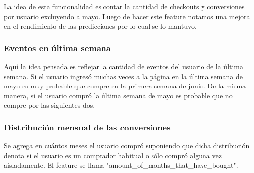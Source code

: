 \documentclass[a4paper]{article}
\begin{document}
\begin{sloppypar}
	\texttt{}
\end{sloppypar}

La idea de esta funcionalidad es contar la cantidad de checkouts y conversiones por usuario excluyendo a mayo. Luego de hacer este feature notamos una mejora en el rendimiento de las predicciones por lo cual se lo mantuvo.


\subsubsection{Eventos en última semana}

\begin{sloppypar}
	\texttt{}
\end{sloppypar}

Aquí la idea pensada es reflejar la cantidad de eventos del usuario de la última semana. Si el usuario ingresó muchas veces a la página en la última semana de mayo es muy probable que compre en la primera semana de junio. De la misma manera, si el usuario compró la última semana de mayo es probable que no compre por las siguientes dos.

\subsubsection{Distribución mensual de las conversiones}

\begin{sloppypar}
	\texttt{}
\end{sloppypar}

Se agrega en cuántos meses el usuario compró suponiendo que dicha distribución denota si el usuario es un comprador habitual o sólo compró alguna vez aisladamente. El feature se llama "amount\_of\_months\_that\_have\_bought".
\end{document}
